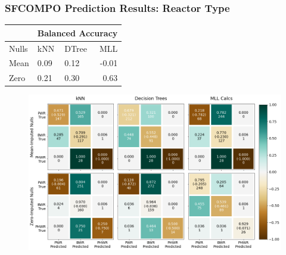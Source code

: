 \begin{frame}
  \frametitle{SFCOMPO Prediction Results: Reactor Type}
  \vspace{-6pt}
  \begin{table}
    \scriptsize
    \begin{tabular}{@{}lllr@{}}
      \toprule
      & \multicolumn{3}{l}{Balanced Accuracy} \\ 
      \toprule
      Nulls & kNN   & DTree  & MLL    \\ \midrule
      Mean  & 0.09  & 0.12   & -0.01  \\
      Zero  & 0.21  & 0.30   & 0.63   \\ \bottomrule
      \end{tabular}
  \end{table}
  \vspace{-6pt}
  \begin{figure}
    \centering
    \includegraphics[height=0.68\textheight]{./figures/confusion_matrix_sfco.png}
  \end{figure}
\end{frame}

